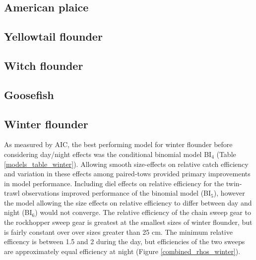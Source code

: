 \documentclass[]{article}
\begin{document}
\hypertarget{american-plaice}{%
\subsection{American plaice}\label{american-plaice}}

\hypertarget{yellowtail-flounder}{%
\subsection{Yellowtail flounder}\label{yellowtail-flounder}}

\hypertarget{witch-flounder}{%
\subsection{Witch flounder}\label{witch-flounder}}

\hypertarget{goosefish}{%
\subsection{Goosefish}\label{goosefish}}

\hypertarget{winter-flounder}{%
\subsection{Winter flounder}\label{winter-flounder}}

As measured by AIC, the best performing model for winter flounder before
considering day/night effects was the conditional binomial model
BI\(_4\) (Table \ref{models_table_winter}). Allowing smooth size-effects
on relative catch efficiency and variation in these effects among
paired-tows provided primary improvements in model performance.
Including diel effects on relative efficiency for the twin-trawl
observations improved performance of the binomial model (BI\(_5\)),
however the model allowing the size effects on relative efficiency to
differ between day and night (BI\(_6\)) would not converge. The relative
efficiency of the chain sweep gear to the rockhopper sweep gear is
greatest at the smallest sizes of winter flounder, but is fairly
constant over over sizes greater than 25 cm. The minimum relative
efficency is between 1.5 and 2 during the day, but efficiencies of the
two sweeps are approximately equal efficiency at night (Figure
\ref{combined_rhos_winter}).
\end{document}
